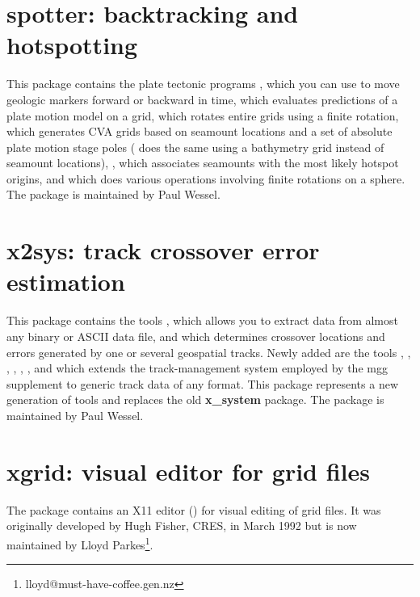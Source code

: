 \section{spotter: backtracking and hotspotting}

This package contains the plate tectonic programs ,
which you can use to move geologic markers forward or backward in time, 
 which evaluates predictions of a plate motion model on a grid,
 which rotates entire grids using a finite rotation,
 which generates CVA grids based on seamount locations
and a set of absolute plate motion stage poles ( does the
same using a bathymetry grid instead of seamount locations), ,
which associates seamounts with the most likely hotspot origins,
and 
which does various operations involving finite rotations on a sphere.  The package
is maintained by Paul Wessel.

\section{x2sys: track crossover error estimation}

This package contains the tools ,
which allows you to extract data from almost any binary or ASCII
data file, and  which determines crossover
locations and errors generated by one or several geospatial tracks.
Newly added are the tools ,  ,
, , ,
,  and  
which extends the track-management system
employed by the mgg supplement to generic track data of any format.
This package represents a new generation of tools and replaces the old
\textbf{x\_system} package.  The package is maintained
by Paul Wessel.

\section{xgrid: visual editor for grid files}

The package contains an X11 editor () for visual
editing of grid files.  It was originally developed by Hugh Fisher, CRES,
in March 1992 but is now maintained by Lloyd Parkes\footnote{lloyd@must-have-coffee.gen.nz}.
